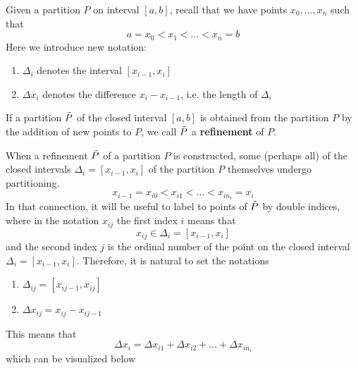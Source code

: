     \begin{theorem}[Refinement]
    Given a partition $P$ on interval $[a, b]$, recall that we have points $x_0, \ldots, x_n$ such that
    \[a = x_0 < x_1 < \ldots < x_n = b\]
    Here we introduce new notation: 
    \begin{enumerate}
      \item $\Delta_i$ denotes the interval $[x_{i-1}, x_i]$
      \item $\Delta x_i$ denotes the difference $x_i - x_{i-1}$, i.e. the length of $\Delta_i$
    \end{enumerate}
    If a partition $\Tilde{P}$ of the closed interval $[a, b]$ is obtained from the partition $P$ by the addition of new points to $P$, we call $\Tilde{P}$ a \textbf{refinement} of $P$. 

    When a refinement $\Tilde{P}$ of a partition $P$ is constructed, some (perhaps all) of the closed intervals $\Delta_i = [x_{i-1}, x_i]$ of the partition $P$ themselves undergo partitioning. 
    \[x_{i-1} = x_{i0} < x_{i1} < \ldots < x_{in_i} = x_i\]
    In that connection, it will be useful to label to points of $\Tilde{P}$ by double indices, where in the notation $x_{ij}$ the first index $i$ means that 
    \[x_{ij} \in \Delta_i = [x_{i-1}, x_i]\]
    and the second index $j$ is the ordinal number of the point on the closed interval $\Delta_i = [x_{i-1}, x_i]$. Therefore, it is natural to set the notations
    \begin{enumerate}
      \item $\Delta_{ij} = [x_{i j-1}, x_{ij}]$
      \item $\Delta x_{ij} = x_{ij} - x_{ij-1}$
    \end{enumerate}
    This means that 
    \[\Delta x_i = \Delta x_{i1} + \Delta x_{i2} + \ldots + \Delta x_{in_i}\]
    which can be visualized below

    \begin{figure}[H]
      \centering 
\end{figure}
\end{theorem}
